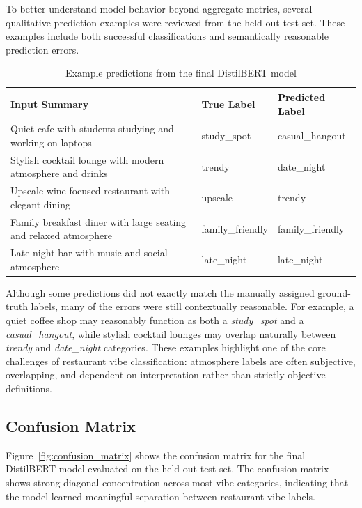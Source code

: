 \documentclass[11pt]{article}
\begin{document}
\medbreak \noindent To better understand model behavior beyond aggregate metrics, several qualitative prediction examples were reviewed 
from the held-out test set. These examples include both successful classifications and semantically reasonable prediction errors.

\begin{table}[h]
\centering
\begin{tabular}{p{6cm} p{3cm} p{3cm}}
\toprule
Input Summary & True Label & Predicted Label \\
\midrule
Quiet cafe with students studying and working on laptops & study\_spot & casual\_hangout \\

Stylish cocktail lounge with modern atmosphere and drinks & trendy & date\_night \\

Upscale wine-focused restaurant with elegant dining & upscale & trendy \\

Family breakfast diner with large seating and relaxed atmosphere & family\_friendly & family\_friendly \\

Late-night bar with music and social atmosphere & late\_night & late\_night \\
\bottomrule
\end{tabular}
\caption{Example predictions from the final DistilBERT model}
\end{table}

\noindent Although some predictions did not exactly match the manually assigned ground-truth labels, many of the errors were still 
contextually reasonable. For example, a quiet coffee shop may reasonably function as both a \textit{study\_spot} and a \textit{casual\_hangout}, 
while stylish cocktail lounges may overlap naturally between \textit{trendy} and \textit{date\_night} categories.
These examples highlight one of the core challenges of restaurant vibe classification: atmosphere labels are often subjective, overlapping, 
and dependent on interpretation rather than strictly objective definitions.


\subsection{Confusion Matrix}

Figure~\ref{fig:confusion_matrix} shows the confusion matrix for the final DistilBERT model evaluated on the held-out test set.
The confusion matrix shows strong diagonal concentration across most vibe categories, indicating that the model learned meaningful separation 
between restaurant vibe labels.
\end{document}
